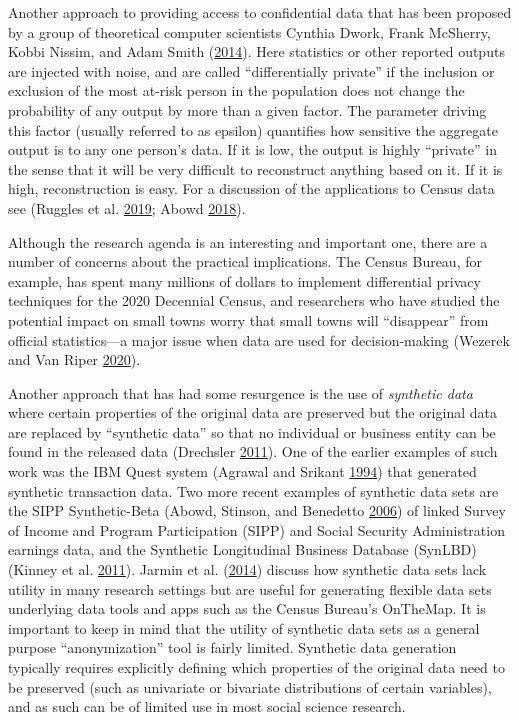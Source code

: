 \documentclass[]{krantz}
\begin{document}
Another approach to providing access to confidential data that has been
proposed by a group of theoretical computer scientists Cynthia Dwork,
Frank McSherry, Kobbi Nissim, and Adam Smith
(\protect\hyperlink{ref-Dworkroth2014}{2014}). Here statistics or other
reported outputs are injected with noise, and are called
``differentially private'' if the inclusion or exclusion of the most
at-risk person in the population does not change the probability of any
output by more than a given factor. The parameter driving this factor
(usually referred to as epsilon) quantifies how sensitive the aggregate
output is to any one person's data. If it is low, the output is highly
``private'' in the sense that it will be very difficult to reconstruct
anything based on it. If it is high, reconstruction is easy. For a
discussion of the applications to Census data see (Ruggles et al.
\protect\hyperlink{ref-ruggles2019}{2019}; Abowd
\protect\hyperlink{ref-abowed2018}{2018}).

Although the research agenda is an interesting and important one, there
are a number of concerns about the practical implications. The Census
Bureau, for example, has spent many millions of dollars to implement
differential privacy techniques for the 2020 Decennial Census, and
researchers who have studied the potential impact on small towns worry
that small towns will ``disappear'' from official statistics---a major
issue when data are used for decision-making (Wezerek and Van Riper
\protect\hyperlink{ref-Wezerek}{2020}).

Another approach that has had some resurgence is the use of
\emph{synthetic data} where certain properties of the original data are
preserved but the original data are replaced by ``synthetic data'' so
that no individual or business entity can be found in the released data
(Drechsler \protect\hyperlink{ref-drechsler2011synthetic}{2011}). One of
the earlier examples of such work was the IBM Quest system (Agrawal and
Srikant \protect\hyperlink{ref-Agrawal1994}{1994}) that generated
synthetic transaction data. Two more recent examples of synthetic data
sets are the SIPP Synthetic-Beta (Abowd, Stinson, and Benedetto
\protect\hyperlink{ref-abowd2006final}{2006}) of linked Survey of Income
and Program Participation (SIPP) and Social Security Administration
earnings data, and the Synthetic Longitudinal Business Database (SynLBD)
(Kinney et al. \protect\hyperlink{ref-kinney2011towards}{2011}). Jarmin
et al. (\protect\hyperlink{ref-jarmin2014expanding}{2014}) discuss how
synthetic data sets lack utility in many research settings but are
useful for generating flexible data sets underlying data tools and apps
such as the Census Bureau's OnTheMap. It is important to keep in mind
that the utility of synthetic data sets as a general purpose
``anonymization'' tool is fairly limited. Synthetic data generation
typically requires explicitly defining which properties of the original
data need to be preserved (such as univariate or bivariate distributions
of certain variables), and as such can be of limited use in most social
science research.
\end{document}
